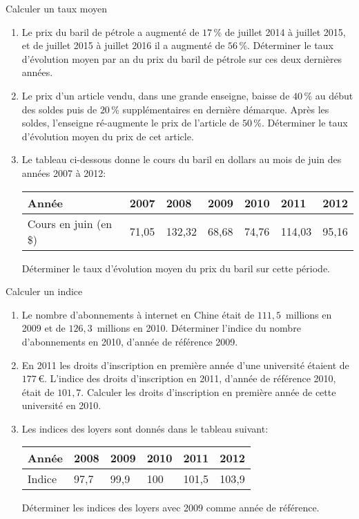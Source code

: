 \documentclass[a4paper, 11pt]{article}
\begin{document}
\exost Calculer un taux moyen
  \begin{enumerate}
    \item Le prix du baril de p\'etrole a augment\'e de $17$\,\% de juillet 2014 à juillet 2015, et de juillet 2015 à juillet 2016 il a augment\'e de $56$\,\%. D\'eterminer le taux d'\'evolution moyen par an du prix du baril de p\'etrole sur ces deux dernières ann\'ees.
    \item Le prix d'un article vendu, dans une grande enseigne, baisse de $40$\,\% au d\'ebut des soldes puis de $20$\,\% suppl\'ementaires en dernière d\'emarque. Après les soldes, l'enseigne r\'e-augmente le prix de l'article de $50$\,\%. D\'eterminer le taux d'\'evolution moyen du prix de cet article.
    \item Le tableau ci-dessous donne le cours du baril en dollars au mois de juin des ann\'ees 2007 à 2012:
    \begin{center}
      \begin{tabular}{|l|l|l|l|l|l|l|}
        \hline
        Ann\'ee                 & 2007  &  2008  & 2009  & 2010  &  2011  & 2012  \\
        \hline
        Cours en juin (en \$) & 71,05 & 132,32 & 68,68 & 74,76 & 114,03 & 95,16 \\
        \hline
      \end{tabular}
    \end{center}
    D\'eterminer le taux d'\'evolution moyen du prix du baril sur cette p\'eriode.
  \end{enumerate}


\exost Calculer un indice

  \begin{enumerate}
    \item Le nombre d'abonnements à internet en Chine \'etait de $111,5$~millions en 2009 et de $126,3$~millions en 2010. D\'eterminer l'indice du nombre d'abonnements en 2010, d'ann\'ee de r\'ef\'erence 2009.
    \item En 2011 les droits d'inscription en première ann\'ee d'une universit\'e \'etaient de $177$\,\euro. L'indice des droits d'inscription en 2011, d'ann\'ee de r\'ef\'erence 2010, \'etait de $101,7$. Calculer les droits d'inscription en première ann\'ee de cette universit\'e en 2010.
    \item Les indices des loyers sont donn\'es dans le tableau suivant:
    \begin{center}
      \begin{tabular}{|l|l|l|l|l|l|}
        \hline
        Ann\'ee  & 2008 & 2009 & 2010 & 2011  & 2012  \\
        \hline
        Indice & 97,7 & 99,9 & 100  & 101,5 & 103,9 \\
        \hline
      \end{tabular}
    \end{center}
    D\'eterminer les indices des loyers avec 2009 comme ann\'ee de r\'ef\'erence.
  \end{enumerate}
\end{document}
